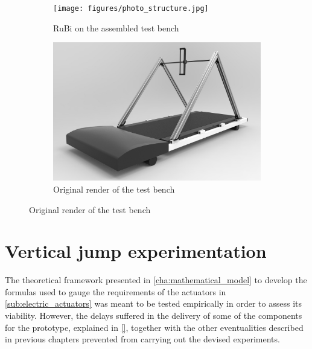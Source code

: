 \begin{figure}[ht!]
    \centering
    \begin{subfigure}[b]{0.49\textwidth}
        \texttt{[image: figures/photo\_structure.jpg]}
        \caption{RuBi on the assembled test bench}
        \label{fig:photo_structure}
    \end{subfigure}
    \begin{subfigure}[b]{0.49\textwidth}
        \includegraphics[width=\textwidth]{figures/legs_structure.jpg}
        \caption{Original render of the test bench}
        \label{fig:legs_structure}
    \end{subfigure}
\end{figure}  



\section{Vertical jump experimentation} %
\label{sec:vertical_jump_experimentation}
The theoretical framework presented in \ref{cha:mathematical_model} to develop the formulas used to gauge the requirements of the actuators in \ref{sub:electric_actuators} was meant to be tested empirically in order to assess its viability.
However, the delays suffered in the delivery of some of the components for the prototype, explained in \ref{}, %
together with the other eventualities described in previous chapters prevented from carrying out the devised experiments.

